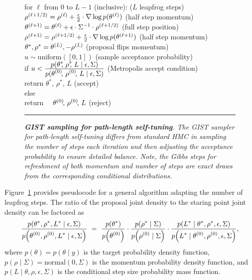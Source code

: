 \documentclass[letterpaper,11pt]{article}
\theoremstyle{plain}%
\theoremstyle{remark}
\begin{document}
\begin{figure}[t]
\begin{flushleft}
for $\ell$ from $0$ to $L - 1$ (inclusive):  \hfill ($L$ leapfrog steps)
\\[-6pt]
\null \qquad $\rho^{(\ell + 1/2)} = \rho^{(\ell)} + \frac{\epsilon}{2} \cdot \nabla \log p(\theta^{(\ell)})$ \hfill (half step momentum)
\\[-6pt]
\null \qquad $\theta^{(\ell + 1)} = \theta^{(\ell)} + \epsilon \cdot \Sigma^{-1} \cdot \rho^{(\ell + 1/2)}$ \hfill (full step position)
\\[-6pt]
\null \qquad $\rho^{(\ell + 1)} = \rho^{(\ell + 1/2)} + \frac{\epsilon}{2} \cdot \nabla \log p(\theta^{(\ell + 1)})$ \hfill (half step momentum)
\\[6pt]
$\theta^*, \rho^* = \theta^{(L)}, -\rho^{(L)}$  \hfill (proposal flips momentum)
\\[4pt]
$u \sim \textrm{uniform}([0, 1])$ \hfill (sample acceptance probability)
\\[4pt]
if
$u < \frac{\displaystyle p(\theta^*\!\!,\, \rho^*\!\!,\,  L \mid \epsilon, \Sigma)}
         {\displaystyle p(\theta^{(0)}\!,\, \rho^{(0)}\!,\, L \mid \epsilon, \Sigma)}$
\hfill (Metropolis accept condition)
\\
\null \quad return $\theta^*\!\!,\, \rho^*\!\!,\, L$ \hfill (accept)
\\[4pt]
else
\\[-12pt]
\null \quad return $\null \quad \pos{\theta}{0}\!,\, \pos{\rho}{0}\!,\, L$ \hfill (reject)
\vspace*{2pt}
\hrule
\caption{\it {\bfseries GIST sampling for path-length self-tuning}.  The GIST sampler for path-length self-tuning differs from standard HMC in sampling the number of steps each iteration and then adjusting the acceptance probability to ensure detailed balance.  Note, the Gibbs steps for refreshment of both momentum and number of steps are exact draws from the corresponding conditional distributions.
}
\label{fig:self-tuning-hmc}
\end{flushleft}
\end{figure}

Figure~\ref{fig:self-tuning-hmc} provides pseudocode for a general algorithm adapting the number of leapfrog steps.  The ratio of the proposal joint density to the staring point joint density can be factored as
\[
\frac{\displaystyle p\!\left(\theta^*, \rho^*,  L^* \mid \epsilon, \Sigma\right)}
         {\displaystyle p\!\left(\pos{\theta}{0}, \pos{\rho}{0}, L^* \mid \epsilon, \Sigma\right)}
\ = \ 
\frac{\displaystyle p\!\left(\theta^*\right)}
     {\displaystyle p\!\left(\pos{\theta}{0}\right)}
\cdot 
\frac{\displaystyle p\!\left(\rho^* \mid \Sigma\right)}
     {\displaystyle p\!\left(\pos{\rho}{0} \mid \Sigma\right)}
\cdot
\frac{\displaystyle p\!\left(L^* \mid \theta^*, \rho^*, \epsilon, \Sigma\right)}
     {\displaystyle p\!\left(L^* \mid \pos{\theta}{0}, \pos{\rho}{0}, \epsilon, \Sigma\right)},
\]
where $p(\theta) = p(\theta \mid y)$ is the target probability density function, $p(\rho \mid \Sigma) = \textrm{normal}(0, \Sigma)$ is the momentum probability density function, and $p(L \mid \theta, \rho, \epsilon, \Sigma)$ is the conditional step size probability mass function.
\end{document}
